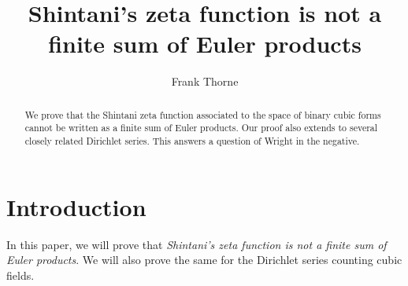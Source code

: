 \documentclass[12pt]{amsart}
\theoremstyle{remark}
\numberwithin{theorem}{section} \numberwithin{equation}{section}
\begin{document}
\title[Shintani's zeta function is not a finite sum of Euler products]
{Shintani's zeta function is not a finite sum of Euler products}

\author{Frank Thorne}
\address{Department of Mathematics, University of South Carolina, 1523 Greene Street, Columbia, SC 29201}

\begin{abstract}
We prove that the Shintani zeta function associated to the space of binary cubic forms cannot be written
as a finite sum of Euler products. Our proof also extends to several closely related Dirichlet series. This answers a
question of Wright \cite{W} in the negative.

\end{abstract}

\maketitle
\section{Introduction}
In this paper, we will prove that {\itshape Shintani's zeta function is not a finite sum of Euler products}.
We will also prove the same for the Dirichlet series counting cubic fields.
\end{document}
